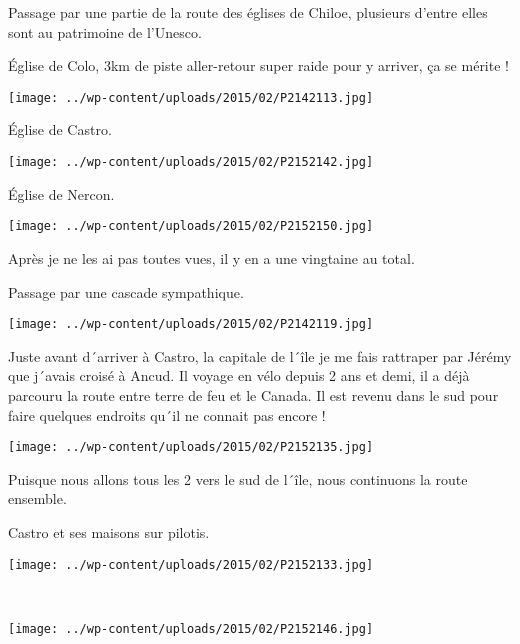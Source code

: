 \pagebreak
 Passage par une partie de la route des églises de Chiloe, plusieurs d'entre elles sont au patrimoine de l'Unesco.

 \'Eglise de Colo, 3km de piste aller-retour super raide pour y arriver, ça se mérite !

\begin{center} \texttt{[image: ../wp-content/uploads/2015/02/P2142113.jpg]} \end{center}

 \'Eglise de Castro.
\begin{center} \texttt{[image: ../wp-content/uploads/2015/02/P2152142.jpg]} \end{center}

 \'Eglise de Nercon.
\begin{center} \texttt{[image: ../wp-content/uploads/2015/02/P2152150.jpg]} \end{center}

 Après je ne les ai pas toutes vues, il y en a une vingtaine au total.

 Passage par une cascade sympathique.
\begin{center} \texttt{[image: ../wp-content/uploads/2015/02/P2142119.jpg]} \end{center}

 Juste avant d´arriver à Castro, la capitale de l´île je me fais rattraper par Jérémy que j´avais croisé à Ancud. Il voyage en vélo depuis 2 ans et demi, il a déjà parcouru la route entre terre de feu et le Canada. Il est revenu dans le sud pour faire quelques endroits qu´il ne connait pas encore !
\begin{center} \texttt{[image: ../wp-content/uploads/2015/02/P2152135.jpg]} \end{center}

 Puisque nous allons tous les 2 vers le sud de l´île, nous continuons la route ensemble.

 Castro et ses maisons sur pilotis.
\begin{center} \texttt{[image: ../wp-content/uploads/2015/02/P2152133.jpg]} \end{center}
\vspace{-\topsep}

\pagebreak
~\\
\begin{center} \texttt{[image: ../wp-content/uploads/2015/02/P2152146.jpg]} \end{center}

